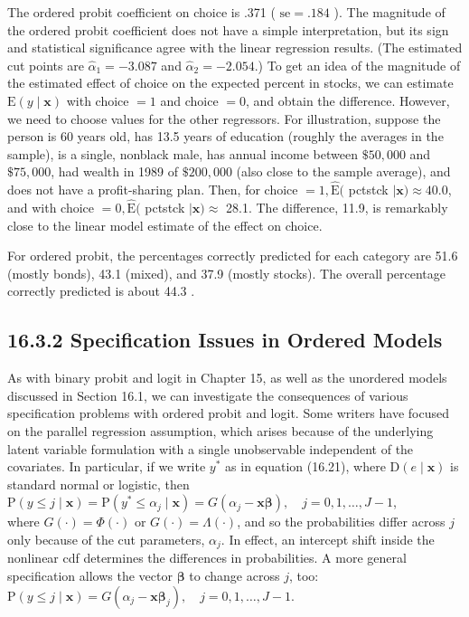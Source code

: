 \documentclass[10pt]{article}
\begin{document}
The ordered probit coefficient on choice is .371 ( $\mathrm{se}=.184$ ). The magnitude of the ordered probit coefficient does not have a simple interpretation, but its sign and statistical significance agree with the linear regression results. (The estimated cut points are $\hat{\alpha}_{1}=-3.087$ and $\hat{\alpha}_{2}=-2.054$.) To get an idea of the magnitude of the estimated effect of choice on the expected percent in stocks, we can estimate $\mathrm{E}(y \mid \mathbf{x})$ with choice $=1$ and choice $=0$, and obtain the difference. However, we need to choose values for the other regressors. For illustration, suppose the person is 60 years old, has 13.5 years of education (roughly the averages in the sample), is a single, nonblack male, has annual income between $\$ 50,000$ and $\$ 75,000$, had wealth in 1989 of $\$ 200,000$ (also close to the sample average), and does not have a profit-sharing plan. Then, for choice $=1, \hat{\mathrm{E}}($ pctstck $\mid \mathbf{x}) \approx 40.0$, and with choice $=0, \hat{\mathrm{E}}($ pctstck $\mid \mathbf{x}) \approx$ 28.1. The difference, 11.9, is remarkably close to the linear model estimate of the effect on choice.

For ordered probit, the percentages correctly predicted for each category are 51.6 (mostly bonds), 43.1 (mixed), and 37.9 (mostly stocks). The overall percentage correctly predicted is about 44.3 .

\subsection*{16.3.2 Specification Issues in Ordered Models}
As with binary probit and logit in Chapter 15, as well as the unordered models discussed in Section 16.1, we can investigate the consequences of various specification problems with ordered probit and logit. Some writers have focused on the parallel regression assumption, which arises because of the underlying latent variable formulation with a single unobservable independent of the covariates. In particular, if we write $y^{*}$ as in equation (16.21), where $\mathrm{D}(e \mid \mathbf{x})$ is standard normal or logistic, then\\
$\mathrm{P}(y \leq j \mid \mathbf{x})=\mathrm{P}\left(y^{*} \leq \alpha_{j} \mid \mathbf{x}\right)=G\left(\alpha_{j}-\mathbf{x} \boldsymbol{\beta}\right), \quad j=0,1, \ldots, J-1$,\\
where $G(\cdot)=\Phi(\cdot)$ or $G(\cdot)=\Lambda(\cdot)$, and so the probabilities differ across $j$ only because of the cut parameters, $\alpha_{j}$. In effect, an intercept shift inside the nonlinear cdf determines the differences in probabilities. A more general specification allows the vector $\boldsymbol{\beta}$ to change across $j$, too:\\
$\mathrm{P}(y \leq j \mid \mathbf{x})=G\left(\alpha_{j}-\mathbf{x} \boldsymbol{\beta}_{j}\right), \quad j=0,1, \ldots, J-1$.
\end{document}
